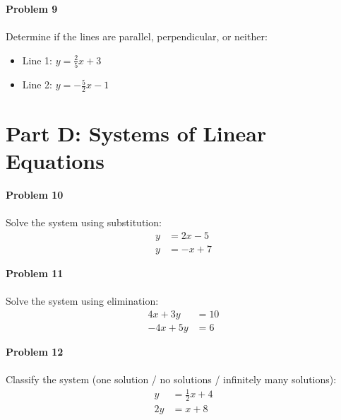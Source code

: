 \documentclass[12pt]{article}
\begin{document}
            \vspace{4cm}

            \textbf{Problem 9}\\\\
            Determine if the lines are parallel, perpendicular, or neither:

            \begin{itemize}
                \item Line 1: $y = \displaystyle\frac{2}{5}x + 3$
                \item Line 2: $y = -\displaystyle\frac{5}{2}x - 1$
            \end{itemize}

            \newpage

        \section*{Part D: Systems of Linear Equations}

            \textbf{Problem 10}\\\\
            Solve the system using substitution:
            \begin{align*}
                y &= 2x - 5\\
                y &= -x + 7
            \end{align*}

            \vspace{4cm}

            \textbf{Problem 11}\\\\
            Solve the system using elimination:
            \begin{align*}
                4x + 3y &= 10\\
                -4x + 5y &= 6
            \end{align*}

            \vspace{4cm}

            \textbf{Problem 12}\\\\
            Classify the system (one solution / no solutions / infinitely many solutions):
            \begin{align*}
                y &= \frac{1}{2}x + 4\\
                2y &= x + 8
            \end{align*}
\end{document}
